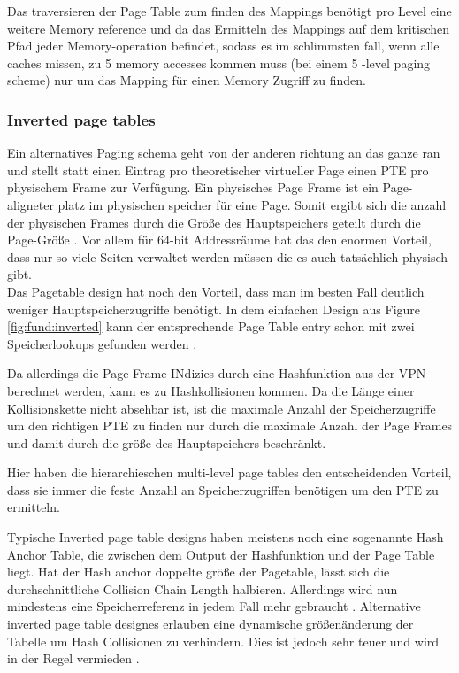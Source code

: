 Das traversieren der Page Table zum finden des Mappings benötigt pro Level eine weitere Memory reference
und da das Ermitteln des Mappings auf dem kritischen Pfad jeder Memory-operation befindet,  sodass
es im schlimmsten fall, wenn alle caches missen, zu 5 memory accesses kommen muss (bei einem 5 -level
paging scheme) nur um das Mapping für einen Memory Zugriff zu finden.

\subsubsection{Inverted page tables}
Ein alternatives Paging schema geht von der anderen richtung an das ganze ran und stellt statt einen
Eintrag pro theoretischer virtueller Page einen PTE pro physischem Frame zur Verfügung.
Ein physisches Page Frame ist ein Page-aligneter platz im physischen speicher für eine Page.
Somit ergibt sich die anzahl der physischen Frames durch die Größe des Hauptspeichers geteilt
durch die Page-Größe .
Vor allem für 64-bit Addressräume hat das den enormen Vorteil, dass nur so viele Seiten verwaltet
werden müssen die es auch tatsächlich physisch gibt.\\
Das Pagetable design hat noch den Vorteil, dass man im besten Fall deutlich weniger Hauptspeicherzugriffe
benötigt. In dem einfachen Design aus Figure \ref{fig:fund:inverted} kann der entsprechende
Page Table entry schon mit zwei Speicherlookups gefunden werden \cite{skarlatos2020elastic}.

Da allerdings die Page Frame INdizies durch eine Hashfunktion aus der VPN berechnet werden, kann es zu
Hashkollisionen kommen. Da die Länge einer Kollisionskette nicht absehbar ist, ist die maximale
Anzahl der Speicherzugriffe um den richtigen PTE zu finden nur durch die maximale Anzahl der
Page Frames und damit durch die größe des Hauptspeichers beschränkt.

Hier haben die hierarchieschen multi-level page tables den entscheidenden Vorteil, dass sie immer
die feste Anzahl an Speicherzugriffen benötigen um den PTE zu ermitteln.

Typische Inverted page table designs haben meistens noch eine sogenannte Hash Anchor Table, die zwischen
dem Output der Hashfunktion und der Page Table liegt. Hat der Hash anchor doppelte größe
der Pagetable, lässt sich die durchschnittliche Collision Chain Length halbieren.
Allerdings wird nun mindestens eine Speicherreferenz in jedem Fall mehr gebraucht \cite{jacob1998virtualissues}.
Alternative inverted page table designes erlauben eine dynamische größenänderung der Tabelle um
Hash Collisionen zu verhindern. Dies ist jedoch sehr teuer und wird in der Regel vermieden \cite{skarlatos2020elastic}.

